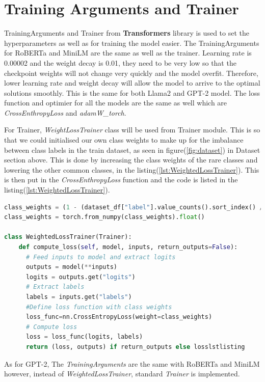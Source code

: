 \section{Training Arguments and Trainer}
TrainingArguments and Trainer from \textbf{Transformers} library is used to set the hyperparameters as well as for training the model easier. The TrainingArguments for RoBERTa and MiniLM are the same as well as the trainer. Learning rate is 0.00002 and the weight decay is 0.01, they need to be very low so that the checkpoint weights will not change very quickly and the model overfit. Therefore, lower learning rate and weight decay will allow the model to arrive to the optimal solutions smoothly. This is the same for both Llama2 and GPT-2 model. The loss function and optimier for all the models are the same as well which are \textit{CrossEnthropyLoss} and \textit{adamW\_torch}.

For Trainer, \textit{WeightLossTrainer} class will be used from Trainer module. This is so that we could initialised our own class weights to make up for the imbalance between class labels in the train dataset, as seen in figure(\ref{fig:dataset}) in Dataset section above. This is done by increasing the class weights of the rare classes and lowering the other common classes, in the listing(\ref{lst:WeightedLossTrainer}). This is then put in the \textit{CrossEnthropyLoss} function and the code is listed in the listing(\ref{lst:WeightedLossTrainer}).

\begin{lstlisting}[language=Python, caption=The code for WeightedLossTrainer in RoBERTa and MiniLM models, label=lst:WeightedLossTrainer]
class_weights = (1 - (dataset_df["label"].value_counts().sort_index() / len(dataset_df))).values
class_weights = torch.from_numpy(class_weights).float()

class WeightedLossTrainer(Trainer):
    def compute_loss(self, model, inputs, return_outputs=False):
      # Feed inputs to model and extract logits
      outputs = model(**inputs)
      logits = outputs.get("logits")
      # Extract labels
      labels = inputs.get("labels")
      #Define loss function with class weights
      loss_func=nn.CrossEntropyLoss(weight=class_weights)
      # Compute loss
      loss = loss_func(logits, labels)
      return (loss, outputs) if return_outputs else losslstlisting
\end{lstlisting}

As for GPT-2, The \textit{TrainingArguments} are the same with RoBERTa and MiniLM however, instead of \textit{WeightedLossTrainer}, standard \textit{Trainer} is implemented.

